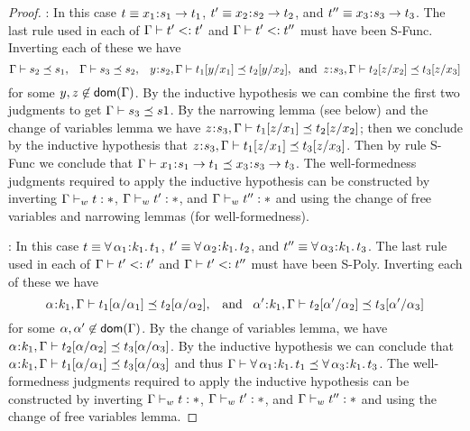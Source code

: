 \begin{proof}
    : 
    In this case $t \equiv x_1\hspace{0.05em}{:}\hspace{0.05em} s_1 \rightarrow t_1$, $t' \equiv x_2\hspace{0.05em}{:}\hspace{0.05em} s_2 \rightarrow t_2$, and $t'' \equiv x_3\hspace{0.05em}{:}\hspace{0.05em} s_3 \rightarrow t_3$. The last rule used in each of $\mathrm{\Gamma} \vdash t' <: t'$ and $\mathrm{\Gamma} \vdash t' <: t''$ must have been {\sc S-Func}. Inverting each of these we have
    \begin{equation*}
    {\mathrm{\Gamma}} \vdash s_2 \preceq s_1, \;\;\; {\mathrm{\Gamma}} \vdash s_3 \preceq s_2, \;\;\;
    {y\hspace{0.05em}{:}\hspace{0.05em} s_2, \mathrm{\Gamma}} \vdash t_1[y/x_1] \preceq t_2[y/x_2], \;\;{\rm and} \;\;
    {z\hspace{0.05em}{:}\hspace{0.05em} s_3, \mathrm{\Gamma}} \vdash t_2[z/x_2] \preceq t_3[z/x_3]
    \end{equation*}
    for some $y,z \not\in{\mathsf{dom}}(\mathrm{\Gamma})$. By the inductive hypothesis we can combine the first two judgments to get ${\mathrm{\Gamma}} \vdash s_3 \preceq s1$. By the narrowing lemma (see below) and the change of variables lemma we have ${z\hspace{0.05em}{:}\hspace{0.05em} s_3, \mathrm{\Gamma}} \vdash t_1[z/x_1] \preceq t_2[z/x_2]$; then we conclude by the inductive hypothesis that ${z\hspace{0.05em}{:}\hspace{0.05em} s_3, \mathrm{\Gamma}} \vdash t_1[z/x_1] \preceq t_3[z/x_3]$. 
    Then by rule {\sc S-Func} we conclude that ${\mathrm{\Gamma}} \vdash x_1\hspace{0.05em}{:}\hspace{0.05em} s_1 \rightarrow t_1 \preceq x_3\hspace{0.05em}{:}\hspace{0.05em} s_3 \rightarrow t_3$.
    The well-formedness judgments required to apply the inductive hypothesis can be constructed by inverting ${\mathrm{\Gamma}} \vdash_w {t} : {*}$, ${\mathrm{\Gamma}} \vdash_w {t'} : {*}$, and ${\mathrm{\Gamma}} \vdash_w {t''} : {*}$ and using the change of free variables and narrowing lemmas (for well-formedness).
    
    : In this case $t \equiv \forall\, \alpha_1\hspace{0.05em}{:}\hspace{0.05em} k_1.\, t_1$, $t' \equiv \forall\, \alpha_2\hspace{0.05em}{:}\hspace{0.05em} k_1.\, t_2$, and $t'' \equiv \forall\, \alpha_3\hspace{0.05em}{:}\hspace{0.05em} k_1.\, t_3$. The last rule used in each of $\mathrm{\Gamma} \vdash t' <: t'$ and $\mathrm{\Gamma} \vdash t' <: t''$ must have been {\sc S-Poly}. Inverting each of these we have
    \begin{equation*}
    {\alpha\hspace{0.05em}{:}\hspace{0.05em}k_1, \mathrm{\Gamma}} \vdash t_1[\alpha/\alpha_1] \preceq t_2[\alpha/\alpha_2], \;\;\;{\rm and} \;\;\;
    {\alpha'\hspace{0.05em}{:}\hspace{0.05em} k_1, \mathrm{\Gamma}} \vdash t_2[\alpha'/\alpha_2] \preceq t_3[\alpha'/\alpha_3]
    \end{equation*}
    for some $\alpha,\alpha' \not\in{\mathsf{dom}}(\mathrm{\Gamma})$. By the change of variables lemma, 
    we have ${\alpha\hspace{0.05em}{:}\hspace{0.05em} k_1, \mathrm{\Gamma}} \vdash t_2[\alpha/\alpha_2] \preceq t_3[\alpha/\alpha_3]$. By the inductive hypothesis we can conclude that
    ${\alpha\hspace{0.05em}{:}\hspace{0.05em} k_1, \mathrm{\Gamma}} \vdash t_1[\alpha/\alpha_1] \preceq t_3[\alpha/\alpha_3]$
    and thus
    ${\mathrm{\Gamma}} \vdash \forall\, \alpha_1\hspace{0.05em}{:}\hspace{0.05em} k_1.\, t_1 \preceq \forall\, \alpha_3\hspace{0.05em}{:}\hspace{0.05em} k_1.\, t_3$.
    The well-formedness judgments required to apply the inductive hypothesis can be constructed by inverting ${\mathrm{\Gamma}} \vdash_w {t} : {*}$, ${\mathrm{\Gamma}} \vdash_w {t'} : {*}$, and ${\mathrm{\Gamma}} \vdash_w {t''} : {*}$ and using the change of free variables lemma.


    \mypara{}

    \mypara{}
    
    \end{proof}

